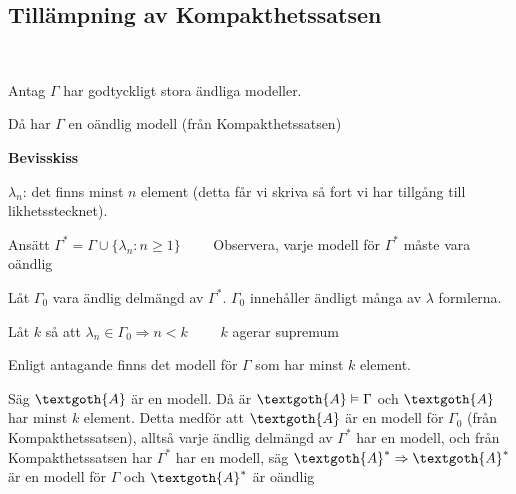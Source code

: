 \subsection{Tillämpning av Kompakthetssatsen}\hfill\\
\par\bigskip
\noindent Antag $\Gamma$ har godtyckligt stora ändliga modeller.
\par\bigskip
\noindent Då har $\Gamma$ en oändlig modell (från Kompakthetssatsen)
\par\bigskip
\noindent\textbf{Bevisskiss}
\par\bigskip
\noindent $\lambda_n$: det finns minst $n$ element (detta får vi skriva så fort vi har tillgång till likhetsstecknet).
\par\bigskip
\noindent Ansätt $\Gamma^* = \Gamma\cup\{\lambda_n:n\geq 1\}\qquad$ Observera, varje modell för $\Gamma^*$ måste vara oändlig
\par\bigskip
\noindent Låt $\Gamma_0$ vara ändlig delmängd av $\Gamma^*$. $\Gamma_0$ innehåller ändligt många av $\lambda$ formlerna.\par
\noindent Låt $k$ så att $\lambda_n\in\Gamma_0\Rightarrow n<k\qquad$ $k$ agerar supremum\par
\noindent Enligt antagande finns det modell för $\Gamma$ som har minst $k$ element.\par
\noindent Säg $\textgoth{A}$ är en modell. Då är $\textgoth{A}\vDash\Gamma$ och $\textgoth{A}$ har minst $k$ element. Detta medför att $\textgoth{A}$ är en modell för $\Gamma_0$ (från Kompakthetssatsen), alltså varje ändlig delmängd av $\Gamma^*$ har en modell, och från Kompakthetssatsen har $\Gamma^*$ har en modell, säg $\textgoth{A}^*\Rightarrow\textgoth{A}^*$ är en modell för $\Gamma$ och $\textgoth{A}^*$ är oändlig 
